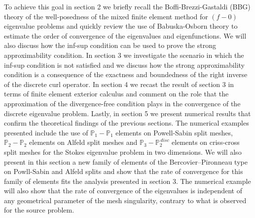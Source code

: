 \documentclass[USenglish]{article}
\theoremstyle{dgthm}
\theoremstyle{dgdef}
\begin{document}
To achieve this goal in section 2 we briefly recall the Boffi-Brezzi-Gastaldi (BBG) theory of the well-posedness of the mixed finite element method for $(f\!-\!0)$ eigenvalue problems and quickly review the use of Babuska-Osborn theory to estimate the order of convergence of the eigenvalues and eigenfunctions.
We will also discuss how the inf-sup condition can be used to prove the strong approximability condition.
In section 3 we investigate the scenario in which the inf-sup condition is not satisfied and we discuss how the strong approximability condition is a consequence of the exactness and boundedness of the right inverse of the discrete curl operator.
In section 4 we recast the result of section 3 in terms of finite element exterior calculus and comment on the role that the approximation of the divergence-free condition plays in the convergence of the discrete eigenvalue problem.
Lastly, in section 5 we present numerical results that confirm the theoretical findings of the previous sections.
The numerical examples presented include the use of $\mathbb{P}_1-\mathbb{P}_1$ elements on Powell-Sabin split meshes, $\mathbb{P}_2-\mathbb{P}_2$ elements on Alfeld split meshes and $\mathbb{P}_3-\mathbb{P}_2^{\,disc}$ elements on criss-cross split meshes for the Stokes eigenvalue problem in two dimensions.
We will also present in this section a new family of elements of the Bercovier--Pironneau type on Powll-Sabin and Alfeld splits and show that the rate of convergence for this family of elements fits the analysis presented in section 3.
The numerical example will also show that the rate of convergence of the eigenvalues is independent of any geometrical parameter of the mesh singularity, contrary to what is observed for the source problem.


\end{document}
